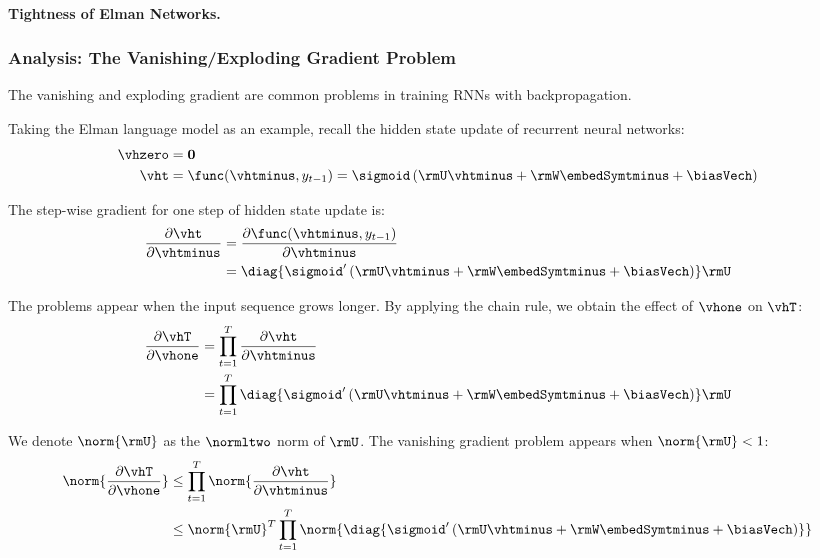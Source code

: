 \begin{example}
    
    
\end{example}

\paragraph{Tightness of Elman Networks.}



\subsubsection{Analysis: The Vanishing/Exploding Gradient Problem}
The vanishing and exploding gradient are common problems in training RNNs with backpropagation. 

Taking the Elman language model as an example, 
recall the hidden state update of recurrent neural networks:
\begin{align}
    \vhzero &= \mathbf{0} \\
    \vht    &= \func(\vhtminus, y_{t-1}) = \sigmoid \left( \rmU \vhtminus + \rmW \embedSymtminus + \biasVech \right)
\end{align}

The step-wise gradient for one step of hidden state update is:
\begin{align}
    \frac{\partial \vht}{\partial \vhtminus} &= \frac{\partial \func(\vhtminus, y_{t-1})}{\partial \vhtminus} \\
    &= \diag{ \sigmoid^\prime \left( \rmU \vhtminus + \rmW \embedSymtminus + \biasVech \right)} \rmU
\end{align}

The problems appear when the input sequence grows longer. 
By applying the chain rule, we obtain the effect of $\vhone$ on $\vhT$: 
\begin{align}
    \frac{\partial \vhT}{\partial \vhone} 
    &= \prod_{t=1}^{T} \frac{\partial \vht}{\partial \vhtminus} \\
    &= \prod_{t=1}^{T} \diag{\sigmoid^\prime \left( \rmU \vhtminus + \rmW \embedSymtminus + \biasVech \right)} \rmU
\end{align}

We denote $\norm{\rmU}$ as the $\normltwo$ norm of $\rmU$. 
The vanishing gradient problem appears when $\norm{\rmU} < 1$:
\begin{align}
   \norm{\frac{\partial \vhT}{\partial \vhone}}
    &\le \prod_{t=1}^{T} \norm{\frac{\partial \vht}{\partial \vhtminus}} \\
    &\le \norm{\rmU}^T \prod_{t=1}^{T} \norm{\diag{\sigmoid^\prime \left( \rmU \vhtminus + \rmW \embedSymtminus + \biasVech \right)}} 
\end{align}

